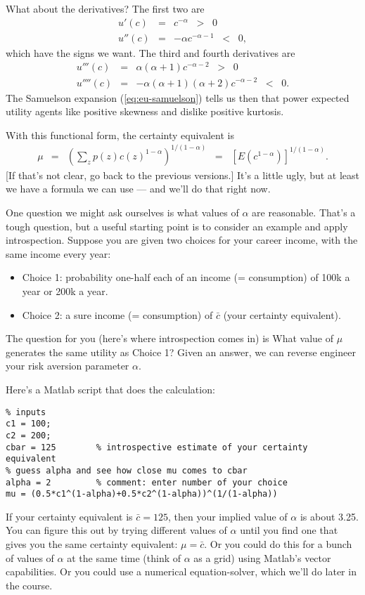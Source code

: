 \documentclass[11pt]{article}
\newcommand{\cbar}{\bar{c}}
\begin{document}
What about the derivatives?
The first two are
\begin{eqnarray*}
    u'(c)  &=& c^{-\alpha} \;\;>\;\; 0 \\
    u''(c) &=& -\alpha c^{-\alpha-1} \;\;<\;\; 0 ,
\end{eqnarray*}
which have the signs we want.
The third and fourth derivatives are
\begin{eqnarray*}
    u'''(c)  &=& \alpha (\alpha+1) c^{-\alpha-2} \;\;>\;\; 0 \\
    u''''(c) &=& - \alpha (\alpha+1) (\alpha+2) c^{-\alpha-2} \;\;<\;\; 0 .
\end{eqnarray*}
The Samuelson expansion (\ref{eq:eu-samuelson}) tells us then that
power expected utility agents like positive skewness
and dislike positive kurtosis.

With this functional form,
the certainty equivalent is
\begin{eqnarray}
    \mu &=& \left( \sum_z p(z) c(z)^{1-\alpha} \right)^{1/(1-\alpha)}
        \;\;=\;\; \left[ E (c^{1-\alpha}) \right]^{1/(1-\alpha)} .
    \label{eq:certainty-equivalent-power}
\end{eqnarray}
[If that's not clear, go back to the previous versions.]
It's a little ugly, but at least we have a formula we can use ---
and we'll do that right now.


One question we might ask ourselves is what values of $\alpha$ are reasonable.
That's a tough question,
but a useful starting point is to consider an example and apply introspection.
Suppose you are given two choices for your career income, with the same
income every year:
\begin{itemize}
\item Choice 1:  probability one-half each of an income (= consumption)
of 100k a year or 200k a year.
\item Choice 2:  a sure income (= consumption) of $\cbar$ (your certainty equivalent).
\end{itemize}
The question for you (here's where introspection comes in)
is What value of $\mu$ generates the same utility as Choice 1?
Given an answer, we can reverse engineer your risk aversion
parameter $\alpha$.


Here's a Matlab script that does the calculation:
\begin{verbatim}
% inputs
c1 = 100;
c2 = 200;
cbar = 125        % introspective estimate of your certainty equivalent
% guess alpha and see how close mu comes to cbar
alpha = 2         % comment: enter number of your choice
mu = (0.5*c1^(1-alpha)+0.5*c2^(1-alpha))^(1/(1-alpha))
\end{verbatim}
If your certainty equivalent is $\cbar = 125$, then
your implied value of $\alpha$ is about 3.25.
You can figure this out by trying different values of $\alpha$
until you find one that gives you the same certainty equivalent:
$ \mu = \cbar$.
Or you could do this for a bunch of values of $\alpha$ at the same time
(think of $\alpha$ as a grid)
using Matlab's vector capabilities.
Or you could use a numerical equation-solver,
which we'll do later in the course.
\end{document}
